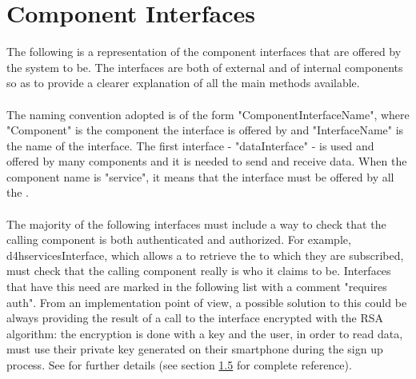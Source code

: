 \documentclass[../../DD.tex]{subfiles}
\begin{document}
\section{Component Interfaces\label{sect:2.5}}

The following is a representation of the component interfaces that are offered by the system to be. The interfaces are both of external and of internal components so as to provide a clearer explanation of all the main methods available.\\\\
The naming convention adopted is of the form "Component\textunderscore InterfaceName", where "Component" is the component the interface is offered by and "InterfaceName" is the name of the interface. The first interface - "dataInterface" - is used and offered by many components and it is needed to send and receive data. When the component name is "service", it means that the interface must be offered by all the .\\\\
The majority of the following interfaces must include a way to check that the calling component is both authenticated and authorized. For example, d4h\textunderscore servicesInterface, which allows a  to retrieve the  to which they are subscribed, must check that the calling component really is who it claims to be. Interfaces that have this need are marked in the following list with a comment "requires auth". From an implementation point of view, a possible solution to this could be always providing the result of a call to the interface encrypted with the RSA algorithm: the encryption is done with a key and the user, in order to read data, must use their private key generated on their smartphone during the sign up process. See  for further details (see section \hyperref[sect:1.5]{1.5} for complete reference).
\end{document}
